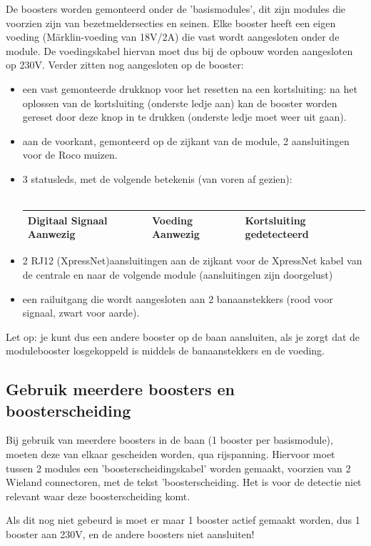 \documentclass[12pt,a4paper]{report}
\newcommand*{\marklin}{M\"{a}rklin}
\begin{document}
De boosters worden gemonteerd onder de 'basismodules', dit zijn modules die voorzien zijn van bezetmeldersecties en seinen. Elke booster heeft een eigen voeding (\marklin-voeding van 18V/2A) die vast wordt aangesloten onder de module. De voedingskabel hiervan moet dus bij de opbouw worden aangesloten op 230V.
Verder zitten nog aangesloten op de booster:
\begin{itemize}
\item een vast gemonteerde drukknop voor het resetten na een kortsluiting: na het oplossen van de kortsluiting (onderste ledje aan) kan de booster worden gereset door deze knop in te drukken (onderste ledje moet weer uit gaan).
\item aan de voorkant, gemonteerd op de zijkant van de module, 2 aansluitingen voor de Roco muizen.
\item 3 statusleds, met de volgende betekenis (van voren af gezien):\\
\\
\begin{tabular}{|l|l|l|}
\hline
Digitaal Signaal Aanwezig&Voeding Aanwezig&Kortsluiting gedetecteerd\\
\hline
\end{tabular}
\item 2 RJ12 (XpressNet)aansluitingen aan de zijkant voor de XpressNet kabel van de centrale en naar de volgende module (aansluitingen zijn doorgelust)
\item een railuitgang die wordt aangesloten aan 2 banaanstekkers (rood voor signaal, zwart voor aarde).
\end{itemize}

Let op: je kunt dus een andere booster op de baan aansluiten, als je zorgt dat de modulebooster losgekoppeld is middels de banaanstekkers en de voeding.

\subsection{Gebruik meerdere boosters en boosterscheiding}
Bij gebruik van meerdere boosters in de baan (1 booster per basismodule), moeten deze van elkaar gescheiden worden, qua rijspanning. Hiervoor moet tussen 2 modules een 'boosterscheidingskabel' worden gemaakt, voorzien van 2 Wieland connectoren, met de tekst 'boosterscheiding. Het is voor de detectie niet relevant waar deze boosterscheiding komt.

Als dit nog niet gebeurd is moet er maar 1 booster actief gemaakt worden, dus 1 booster aan 230V, en  de andere boosters niet aansluiten!
\end{document}
